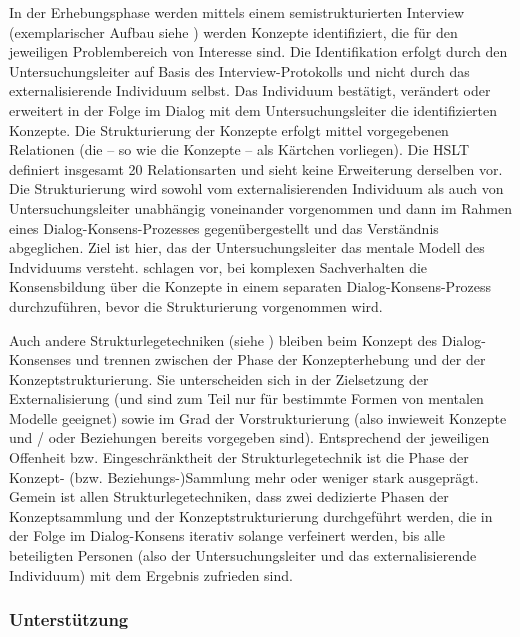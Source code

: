 In der Erhebungsphase werden mittels einem semistrukturierten Interview (exemplarischer Aufbau siehe \citep{Scheele88}) werden Konzepte identifiziert, die für den jeweiligen Problembereich von Interesse sind. Die Identifikation erfolgt durch den Untersuchungsleiter auf Basis des Interview-Protokolls und nicht durch das externalisierende Individuum selbst. Das Individuum bestätigt, verändert oder erweitert in der Folge im Dialog mit dem Untersuchungsleiter die identifizierten Konzepte. Die Strukturierung der Konzepte erfolgt mittel vorgegebenen Relationen (die -- so wie die Konzepte -- als Kärtchen vorliegen). Die \gls{HSLT} definiert insgesamt 20 Relationsarten und sieht keine Erweiterung derselben vor. Die Strukturierung wird sowohl vom externalisierenden Individuum als auch von Untersuchungsleiter unabhängig voneinander vorgenommen und dann im Rahmen eines Dialog-Konsens-Prozesses gegenübergestellt und das Verständnis abgeglichen. Ziel ist hier, das der Untersuchungsleiter das mentale Modell des Indviduums versteht. \citet{Scheele88} schlagen vor, bei komplexen Sachverhalten die Konsensbildung über die Konzepte in einem separaten Dialog-Konsens-Prozess durchzuführen, bevor die Strukturierung vorgenommen wird.

Auch andere Strukturlegetechniken (siehe \citep{Dann92}) bleiben beim Konzept des Dialog-Konsenses und trennen zwischen der Phase der Konzepterhebung und der der Konzeptstrukturierung. Sie unterscheiden sich in der Zielsetzung der Externalisierung (und sind zum Teil nur für bestimmte Formen von mentalen Modelle geeignet) sowie im Grad der Vorstrukturierung (also inwieweit Konzepte und / oder Beziehungen bereits vorgegeben sind). Entsprechend der jeweiligen Offenheit bzw. Eingeschränktheit der Strukturlegetechnik ist die Phase der Konzept- (bzw. Beziehungs-)Sammlung mehr oder weniger stark ausgeprägt. Gemein ist allen Strukturlegetechniken, dass zwei dedizierte Phasen der Konzeptsammlung und der Konzeptstrukturierung durchgeführt werden, die in der Folge im Dialog-Konsens iterativ solange verfeinert werden, bis alle beteiligten Personen (also der Untersuchungsleiter und das externalisierende Individuum) mit dem Ergebnis zufrieden sind.

\subsubsection{Unterstützung}

